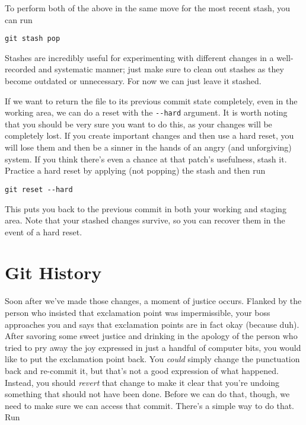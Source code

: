 \par{
To perform both of the above in the same move for the most recent stash, you
can run
}

\begin{verbatim}
git stash pop
\end{verbatim}

\par{
Stashes are incredibly useful for experimenting with different changes in a
well-recorded and systematic manner; just make sure to clean out stashes as
they become outdated or unnecessary. For now we can just leave it stashed.
}

\par{
If we want to return the file to its previous commit state completely, even in
the working area, we can do a reset with the \verb+--hard+ argument. It is
worth noting that you should be very sure you want to do this, as your changes
will be completely lost. If you create important changes and then use a hard
reset, you will lose them and then be a sinner in the hands of an angry (and
unforgiving) system. If you think there's even a chance at that patch's
usefulness, stash it. Practice a hard reset by applying (not popping) the
stash and then run
}

\begin{verbatim}
git reset --hard
\end{verbatim}

\par{
This puts you back to the previous commit in both your working and staging
area. Note that your stashed changes survive, so you can recover them in the
event of a hard reset.
}

\section{Git History}
\par{
Soon after we've made those changes, a moment of justice occurs. Flanked by the
person who insisted that exclamation point was impermissible, your boss
approaches you and says that exclamation points are in fact okay (because
duh). After savoring some sweet justice and drinking in the apology of the
person who tried to pry away the joy expressed in just a handful of computer
bits, you would like to put the exclamation point back. You \emph{could}
simply change the punctuation back and re-commit it, but that's not a good
expression of what happened. Instead, you should \emph{revert} that change to
make it clear that you're undoing something that should not have been done.
Before we can do that, though, we need to make sure we can access that commit.
There's a simple way to do that. Run
}

